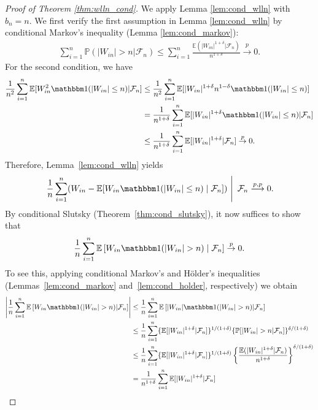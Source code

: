 \documentclass[aos]{imsart}
\theoremstyle{plain}
\theoremstyle{remark}
\newcommand{\E}{\mathbb E}								%
\renewcommand{\P}{\mathbb{P}}							%
\newcommand{\indicator}{\mathbbm 1}						%
\newcommand{\convp}{\overset p \rightarrow}             %
\newcommand{\convpp}{\overset {p,p} \longrightarrow}    %
\begin{document}
	
	\begin{proof}[Proof of Theorem \ref{thm:wlln_cond}] 
		We apply Lemma \ref{lem:cond_wlln} with $b_n=n$. We first verify the first assumption in Lemma \ref{lem:cond_wlln} by conditional Markov's inequality (Lemma \ref{lem:cond_markov}):
		\begin{align*}
			\sum_{i=1}^n\P(|W_{in}|>n|\mathcal{F}_n)\leq \sum_{i=1}^n\frac{\E(|W_{in}|^{1+\delta}|\mathcal{F}_n)}{n^{1+\delta}}\convp0.
		\end{align*}
		For the second condition, we have
		\begin{align*}
			\frac{1}{n^{2}}\sum_{i=1}^n\E[W_{in}^2\indicator(|W_{in}|\leq n)|\mathcal{F}_n]
			&
			\leq \frac{1}{n^2}\sum_{i=1}^n\E[|W_{in}|^{1+\delta}n^{1-\delta}\indicator(|W_{in}|\leq n)]\\
			&
			= \frac{1}{n^{1+\delta}}\sum_{i=1}^n\E[|W_{in}|^{1+\delta}\indicator(|W_{in}|\leq n)|\mathcal{F}_n]\\
			&
			\leq \frac{1}{n^{1+\delta}}\sum_{i=1}^n\E[|W_{in}|^{1+\delta}|\mathcal{F}_n]\convp0.
		\end{align*}
		Therefore, Lemma~\ref{lem:cond_wlln} yields
		\begin{align*}
			\left.\frac1n\sum_{i=1}^n (W_{in}-\E[W_{in}\indicator(|W_{in}|\leq n) \mid \mathcal{F}_n]) \ \right|\ \mathcal{F}_n \convpp 0.
		\end{align*}
		By conditional Slutsky (Theorem~\ref{thm:cond_slutsky}), it now suffices to show that
		\begin{align*}
			\frac{1}{n}\sum_{i=1}^n\E\left[W_{in}\indicator(|W_{in}| > n) \mid \mathcal{F}_n\right] \convp 0.
		\end{align*}
		To see this, applying conditional Markov's and H\"older's inequalities (Lemmas~\ref{lem:cond_markov} and~\ref{lem:cond_holder}, respectively) we obtain
		\begin{align*}
			\left|\frac{1}{n}\sum_{i=1}^n\E\left[W_{in}\indicator(|W_{in}| > n)|\mathcal{F}_n\right]\right|
			&
			\leq \frac{1}{n}\sum_{i=1}^n\E\left[|W_{in}|\indicator(|W_{in}| > n)|\mathcal{F}_n\right]\\
			&
			\leq\frac{1}{n}\sum_{i=1}^n\{\E[|W_{in}|^{1+\delta}|\mathcal{F}_n]\}^{1/(1+\delta)}\{\P[|W_{in}|>n|\mathcal{F}_n]\}^{\delta/(1+\delta)} \\
			&
			\leq \frac{1}{n}\sum_{i=1}^n\{\E[|W_{in}|^{1+\delta}|\mathcal{F}_n]\}^{1/(1+\delta)}\left\{\frac{\E(|W_{in}|^{1+\delta}|\mathcal{F}_n)}{n^{1+\delta}}\right\}^{\delta/(1+\delta)}\\
			&
			=\frac{1}{{n^{1+\delta}}}\sum_{i=1}^n\E[|W_{in}|^{1+\delta}|\mathcal{F}_n]\\

\end{align*}
\end{proof}
\end{document}
